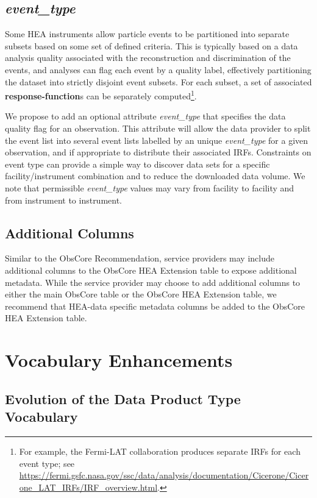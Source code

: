 \documentclass[11pt,a4paper]{ivoa}
\begin{document}
\subsection{{\em event\_type}}
\label{sec:evttype}

Some \gls{HEA} instruments allow particle events to be partitioned into separate subsets based on some set of defined criteria.  This is typically based on a data analysis quality associated with the reconstruction and  discrimination of the events, and analyses can flag each event by a quality label, effectively partitioning the dataset into strictly disjoint event subsets. For each subset, a set of associated {\bf response-function}s can be separately computed\footnote{For example, the Fermi-LAT collaboration produces separate \glspl{IRF} for each event type; see \url{https://fermi.gsfc.nasa.gov/ssc/data/analysis/documentation/Cicerone/Cicerone_LAT_IRFs/IRF_overview.html}.}.

We propose to add an optional attribute {\em event\_type\/} that specifies the data quality flag for an observation. This attribute will allow the data provider to split the event list into several event lists labelled by an unique {\em event\_type\/} for a given observation, and if appropriate to distribute their associated \glspl{IRF}. Constraints on event type can provide a simple way to discover data sets for a specific facility/instrument combination and to reduce the downloaded data volume. We note that permissible {\em event\_type\/} values may vary from facility to facility and from instrument to instrument.

\subsection{Additional Columns}

Similar to the ObsCore Recommendation, service providers may include additional columns to the ObsCore \gls{HEA} Extension table to expose additional metadata.  While the service provider may choose to add additional columns to either the main ObsCore table or the ObsCore \gls{HEA} Extension table, we recommend that \gls{HEA}-data specific metadata columns be added to the ObsCore \gls{HEA} Extension table.

\section{Vocabulary Enhancements}
\label{sec:voc}

\subsection{Evolution of the Data Product Type Vocabulary}
\label{sec:voc_product_type}
\end{document}
